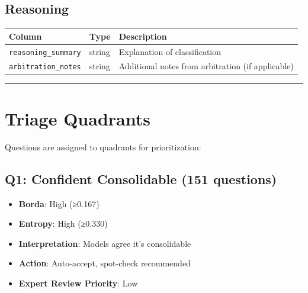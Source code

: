 \documentclass[
  letterpaper,
]{report}
\providecommand{\tightlist}{%
  \setlength{\itemsep}{0pt}\setlength{\parskip}{0pt}}
\begin{document}
\subsection{Reasoning}\label{reasoning}

\begin{longtable}[]{@{}
  >{\raggedright\arraybackslash}p{}
  >{\raggedright\arraybackslash}p{}
  >{\raggedright\arraybackslash}p{}@{}}
\toprule\noalign{}
\begin{minipage}[b]{\linewidth}\raggedright
Column
\end{minipage} & \begin{minipage}[b]{\linewidth}\raggedright
Type
\end{minipage} & \begin{minipage}[b]{\linewidth}\raggedright
Description
\end{minipage} \\
\midrule\noalign{}
\endhead
\bottomrule\noalign{}
\endlastfoot
\texttt{reasoning\_summary} & string & Explanation of classification \\
\texttt{arbitration\_notes} & string & Additional notes from arbitration
(if applicable) \\
\end{longtable}

\begin{center}\rule{0.5\linewidth}{0.5pt}\end{center}

\section{Triage Quadrants}\label{triage-quadrants}

Questions are assigned to quadrants for prioritization:

\subsection{Q1: Confident Consolidable (151
questions)}\label{q1-confident-consolidable-151-questions}

\begin{itemize}
\tightlist
\item
  \textbf{Borda}: High (≥0.167)
\item
  \textbf{Entropy}: High (≥0.330)
\item
  \textbf{Interpretation}: Models agree it's consolidable
\item
  \textbf{Action}: Auto-accept, spot-check recommended
\item
  \textbf{Expert Review Priority}: Low
\end{itemize}
\end{document}
